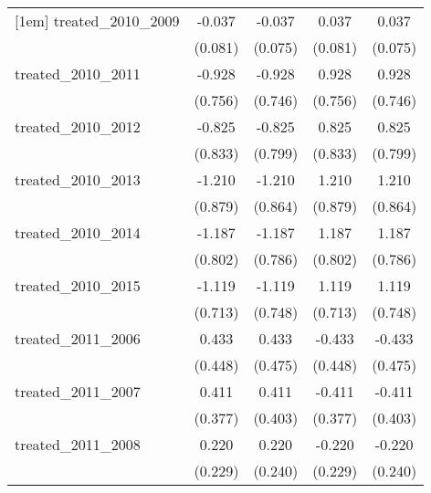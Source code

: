 {\begin{tabular}{l*{4}{c}}
[1em]
treated\_2010\_2009&      -0.037         &      -0.037         &       0.037         &       0.037         \\
            &     (0.081)         &     (0.075)         &     (0.081)         &     (0.075)         \\
[1em]
treated\_2010\_2011&      -0.928         &      -0.928         &       0.928         &       0.928         \\
            &     (0.756)         &     (0.746)         &     (0.756)         &     (0.746)         \\
[1em]
treated\_2010\_2012&      -0.825         &      -0.825         &       0.825         &       0.825         \\
            &     (0.833)         &     (0.799)         &     (0.833)         &     (0.799)         \\
[1em]
treated\_2010\_2013&      -1.210         &      -1.210         &       1.210         &       1.210         \\
            &     (0.879)         &     (0.864)         &     (0.879)         &     (0.864)         \\
[1em]
treated\_2010\_2014&      -1.187         &      -1.187         &       1.187         &       1.187         \\
            &     (0.802)         &     (0.786)         &     (0.802)         &     (0.786)         \\
[1em]
treated\_2010\_2015&      -1.119         &      -1.119         &       1.119         &       1.119         \\
            &     (0.713)         &     (0.748)         &     (0.713)         &     (0.748)         \\
[1em]
treated\_2011\_2006&       0.433         &       0.433         &      -0.433         &      -0.433         \\
            &     (0.448)         &     (0.475)         &     (0.448)         &     (0.475)         \\
[1em]
treated\_2011\_2007&       0.411         &       0.411         &      -0.411         &      -0.411         \\
            &     (0.377)         &     (0.403)         &     (0.377)         &     (0.403)         \\
[1em]
treated\_2011\_2008&       0.220         &       0.220         &      -0.220         &      -0.220         \\
            &     (0.229)         &     (0.240)         &     (0.229)         &     (0.240)         \\

\end{tabular}}
